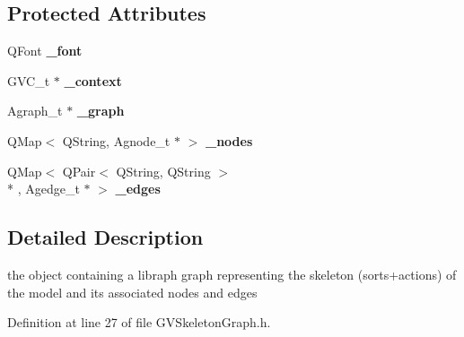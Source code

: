 \subsection*{Protected Attributes}
\begin{DoxyCompactItemize}
\item 
\hypertarget{classGVSkeletonGraph_a09545a121bbd9ef0c0c0a1130f5b11ee}{Q\+Font {\bfseries \+\_\+font}}\label{classGVSkeletonGraph_a09545a121bbd9ef0c0c0a1130f5b11ee}

\item 
\hypertarget{classGVSkeletonGraph_ace0fb45d3ca589997beabf430a889eb8}{G\+V\+C\+\_\+t $\ast$ {\bfseries \+\_\+context}}\label{classGVSkeletonGraph_ace0fb45d3ca589997beabf430a889eb8}

\item 
\hypertarget{classGVSkeletonGraph_abf8e96cecc53806d0fcf5733695b6f0f}{Agraph\+\_\+t $\ast$ {\bfseries \+\_\+graph}}\label{classGVSkeletonGraph_abf8e96cecc53806d0fcf5733695b6f0f}

\item 
\hypertarget{classGVSkeletonGraph_aa56918b8143b0bdb266705cb126cdab8}{Q\+Map$<$ Q\+String, Agnode\+\_\+t $\ast$ $>$ {\bfseries \+\_\+nodes}}\label{classGVSkeletonGraph_aa56918b8143b0bdb266705cb126cdab8}

\item 
\hypertarget{classGVSkeletonGraph_acbf9854e1bf81193cf0617202f2bc868}{Q\+Map$<$ Q\+Pair$<$ Q\+String, Q\+String $>$\\*
, Agedge\+\_\+t $\ast$ $>$ {\bfseries \+\_\+edges}}\label{classGVSkeletonGraph_acbf9854e1bf81193cf0617202f2bc868}

\end{DoxyCompactItemize}


\subsection{Detailed Description}
the object containing a libraph graph representing the skeleton (sorts+actions) of the model and its associated nodes and edges 

Definition at line 27 of file G\+V\+Skeleton\+Graph.\+h.



